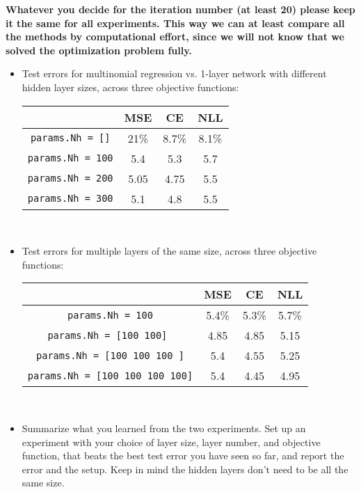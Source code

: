 \documentclass[12pt]{amsart}
\begin{document}
\begin{enumerate}
{{\begin{enumerate}
{{{{{{\bf Whatever you decide for the iteration number (at least 20) please keep it the same for all experiments. 
This way we can at least compare all the methods by computational effort, since we will not know that we solved the optimization problem fully.} 

\begin{itemize}
\item Test errors for multinomial regression vs. 1-layer network with different hidden layer sizes, across three objective functions: \\

\begin{tabular}{|c|c|c|c|}\hline
 & MSE & CE & NLL \\ \hline
 \verb{params.Nh = []{ &21\%  &8.7\% &8.1\% \\ \hline
 \verb{params.Nh = 100{ &5.4 &  5.3  & 5.7\\ \hline
 \verb{params.Nh = 200{ &5.05& 4.75 & 5.5 \\ \hline
 \verb{params.Nh = 300{ &5.1 & 4.8 & 5.5 \\ \hline
\end{tabular} \\

\item Test errors for multiple layers of the same size, across three objective functions: \\

\begin{tabular}{|c|c|c|c|}\hline
 & MSE & CE & NLL \\ \hline
 \verb{params.Nh = 100{ &5.4\%&5.3\%&5.7\% \\ \hline
 \verb{params.Nh = [100 100] { &4.85& 4.85& 5.15 \\ \hline
 \verb{params.Nh = [100 100 100 ]{ &5.4&4.55&5.25 \\ \hline
  \verb{params.Nh = [100 100 100 100]{ &5.4& 4.45&4.95 \\ \hline
\end{tabular}\\

\item Summarize what you learned from the two experiments. Set up an experiment 
with your choice of layer size, layer number, and objective function, that beats the best test error you have seen so far, and report the error and the setup. Keep in mind the hidden layers don't need to be all the same size. \\
\end{itemize}

}}}}}
\end{enumerate}}}
\end{enumerate}
\end{document}
